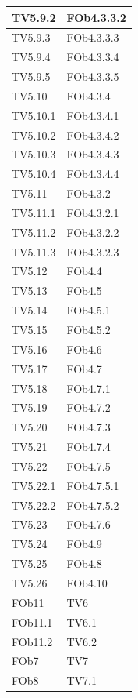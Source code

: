 \begin{longtable}{|p{2.5cm}|p{5cm}|}
\hline
TV5.9.2 & FOb4.3.3.2\\
\hline
TV5.9.3 & FOb4.3.3.3\\
\hline
TV5.9.4 & FOb4.3.3.4\\
\hline
TV5.9.5 & FOb4.3.3.5\\
\hline
TV5.10 & FOb4.3.4\\ %
\hline
TV5.10.1 & FOb4.3.4.1\\
\hline
TV5.10.2 & FOb4.3.4.2\\
\hline
TV5.10.3 & FOb4.3.4.3\\
\hline
TV5.10.4 & FOb4.3.4.4\\
\hline
TV5.11 & FOb4.3.2\\ %
\hline
TV5.11.1 & FOb4.3.2.1\\
\hline
TV5.11.2 & FOb4.3.2.2\\
\hline
TV5.11.3 & FOb4.3.2.3\\
\hline
TV5.12 & FOb4.4\\ %
\hline
TV5.13 & FOb4.5\\ %
\hline
TV5.14 & FOb4.5.1\\ %
\hline
TV5.15 & FOb4.5.2\\ %
\hline
TV5.16 & FOb4.6\\ %
\hline
TV5.17 & FOb4.7\\ %
\hline
TV5.18 & FOb4.7.1\\ %
\hline
TV5.19 & FOb4.7.2\\ %
\hline
TV5.20 & FOb4.7.3\\ %
\hline
TV5.21 & FOb4.7.4\\ %
\hline
TV5.22 & FOb4.7.5\\ %
\hline
TV5.22.1 & FOb4.7.5.1\\ %
\hline
TV5.22.2 & FOb4.7.5.2\\ %
\hline 
TV5.23 & FOb4.7.6\\ %
\hline 
TV5.24 & FOb4.9\\ %
\hline
TV5.25 & FOb4.8\\ %
\hline
TV5.26 & FOb4.10\\%
	\hline
	FOb11 & TV6\\
	\hline
	FOb11.1 & TV6.1\\
	\hline
	FOb11.2 & TV6.2\\	
	\hline
	FOb7 & TV7\\
	\hline
	FOb8 & TV7.1\\
\hline
\end{longtable}








